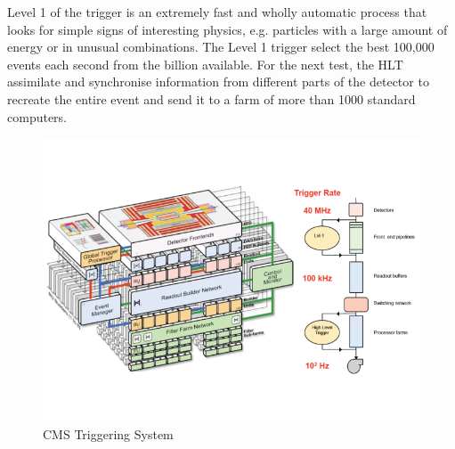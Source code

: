 Level 1 of the trigger is an extremely fast and wholly automatic process that looks for simple signs of interesting physics, e.g. particles with a large amount of energy or in unusual combinations. The Level 1 trigger select the best 100,000 events each second from the billion available. For the next test, the HLT assimilate and synchronise information from different parts of the detector to recreate the entire event and send it to a farm of more than 1000 standard computers.

\begin{figure}[H]
  \caption{CMS Triggering System \label{fig:TRIGGER}}
  \centering
\includegraphics[width=14cm]{CMS_chapter_plots/TRIGGER}
\end{figure}

